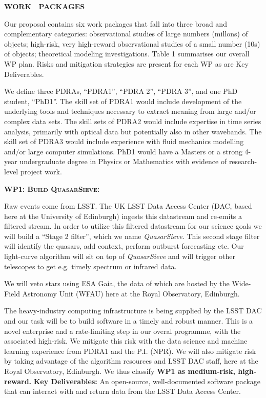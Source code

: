 \smallskip
\smallskip
\noindent
{\bf  WORK  $\;$  PACKAGES} 

\smallskip
\smallskip
\noindent
Our proposal contains six work packages that fall into three broad
and complementary categories: observational studies of large numbers
(millons) of objects; high-risk, very high-reward observational
studies of a small number (10s) of objects; theoretical modeling
investigations. Table 1 summarises our overall WP plan. Risks and
mitigation strategies are present for each WP as are Key Deliverables.

\smallskip
\smallskip
\noindent
We define three PDRAs, ``PDRA1'', ``PDRA 2'', ``PDRA 3'', and one PhD
student, ``PhD1''.  The skill set of PDRA1 would include development
of the underlying tools and techniques necessary to extract meaning
from large and/or complex data sets.  The skill sets of PDRA2 would
include expertise in time series analysis, primarily with optical
data but potentially also in other wavebands.  The skill set of PDRA3
would include experience with fluid mechanics modelling and/or large
computer simulations.  PhD1 would have a Masters or a strong 4-year
undergraduate degree in Physics or Mathematics with evidence of
research-level project work.

\medskip \medskip
\smallskip
\smallskip
\noindent
\textbf{\textsc{WP1: Build QuasarSieve:}} 

\smallskip
\smallskip
\noindent
Raw events come from LSST. The UK LSST Data Access Center (DAC, based
here at the University of Edinburgh) ingests this datastream and
re-emits a filtered stream. In order to utilize this filtered
datastream for our science goals we will build a ``Stage 2 filter'',
which we name {\it QuasarSieve}.  This second stage filter will
identify the quasars, add context, perform outburst forecasting etc.
Our light-curve algorithm will sit on top of {\it QuasarSieve} and
will trigger other telescopes to get e.g. timely spectrum or infrared
data.

\smallskip
\smallskip
\noindent
We will veto stars using ESA Gaia, the data of which are hosted by the
Wide-Field Astronomy Unit (WFAU) here at the Royal Observatory,
Edinburgh.

\smallskip
\smallskip
\noindent
The heavy-industry computing infrastructure is being supplied by the
LSST DAC and our task will be to build software in a timely and robust
manner.  This is a novel enterprise and a rate-limiting step in our
overal programme, with the associated high-risk.  We mitigate this
risk with the data science and machine learning experience from PDRA1
and the P.I. (NPR).  We will also mitigate risk by taking advantage of
the algorithm resources and LSST DAC staff, here at the Royal
Observatory, Edinburgh.  We thus classify {\bf WP1 as medium-risk,
high-reward.}  {\bf Key Deliverables:} An open-source, well-documented
software package that can interact with and return data from the LSST
Data Access Center.



